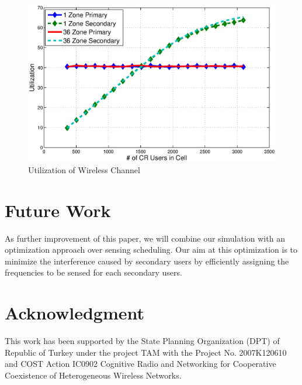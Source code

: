 \documentclass[conference,compsoc]{IEEEtran}
\begin{document}
\begin{figure}[t]
\centering
\includegraphics[width=0.99\columnwidth,keepaspectratio] {figs/util.eps}
\caption{Utilization of Wireless Channel} \label{fig:util}
\end{figure}

\section{\label{sec:future}Future Work}
As further improvement of this paper, we will combine our simulation with an optimization approach over sensing scheduling. Our aim at this optimization is to minimize the interference caused by secondary users by efficiently assigning the frequencies to be sensed for each secondary users.

\section*{Acknowledgment}
This work has been supported by the State Planning Organization (DPT) of Republic of Turkey under the project TAM with the Project No. 2007K120610 and COST Action IC0902 Cognitive Radio and Networking for Cooperative Coexistence of Heterogeneous Wireless Networks.




\end{document}
